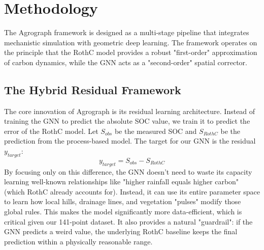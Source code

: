 \documentclass[conference]{IEEEtran}
\begin{document}
\section{Methodology}

The Agrograph framework is designed as a multi-stage pipeline that integrates mechanistic simulation with geometric deep learning. The framework operates on the principle that the RothC model provides a robust "first-order" approximation of carbon dynamics, while the GNN acts as a "second-order" spatial corrector.

\subsection{The Hybrid Residual Framework}
The core innovation of Agrograph is its residual learning architecture. Instead of training the GNN to predict the absolute SOC value, we train it to predict the error of the RothC model. Let $S_{obs}$ be the measured SOC and $S_{RothC}$ be the prediction from the process-based model. The target for our GNN is the residual $y_{target}$:
\begin{equation}
y_{target} = S_{obs} - S_{RothC}
\end{equation}
By focusing only on this difference, the GNN doesn't need to waste its capacity learning well-known relationships like "higher rainfall equals higher carbon" (which RothC already accounts for). Instead, it can use its entire parameter space to learn how local hills, drainage lines, and vegetation "pulses" modify those global rules. This makes the model significantly more data-efficient, which is critical given our 141-point dataset. It also provides a natural "guardrail": if the GNN predicts a weird value, the underlying RothC baseline keeps the final prediction within a physically reasonable range.
\end{document}
